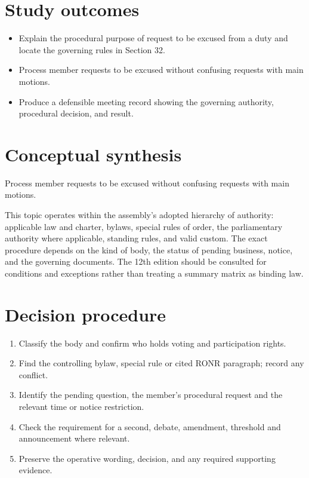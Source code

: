 \documentclass[11pt]{article}
\begin{document}
\SuiteOpen
{}
\section{Study outcomes}
\begin{itemize}[leftmargin=*,itemsep=4pt]
\item Explain the procedural purpose of request to be excused from a duty and locate the governing rules in Section 32.
\item Process member requests to be excused without confusing requests with main motions.
\item Produce a defensible meeting record showing the governing authority, procedural decision, and result.
\end{itemize}

\section{Conceptual synthesis}
Process member requests to be excused without confusing requests with main motions.

This topic operates within the assembly’s adopted hierarchy of authority: applicable law and charter, bylaws, special rules of order, the parliamentary authority where applicable, standing rules, and valid custom. The exact procedure depends on the kind of body, the status of pending business, notice, and the governing documents. The 12th edition should be consulted for conditions and exceptions rather than treating a summary matrix as binding law.
\section{Decision procedure}
\begin{enumerate}[leftmargin=*,itemsep=4pt]
\item Classify the body and confirm who holds voting and participation rights.
\item Find the controlling bylaw, special rule or cited RONR paragraph; record any conflict.
\item Identify the pending question, the member’s procedural request and the relevant time or notice restriction.
\item Check the requirement for a second, debate, amendment, threshold and announcement where relevant.
\item Preserve the operative wording, decision, and any required supporting evidence.
\end{enumerate}
\end{document}
